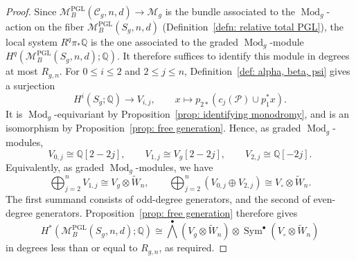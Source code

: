 \documentclass[10pt,a4paper]{amsart}
\DeclareMathOperator{\Mod}{Mod}
\DeclareMathOperator{\PGL}{PGL}
\DeclareMathOperator{\Sym}{Sym}
\newcommand{\C}{\mathcal{C}}
\newcommand{\M}{\mathcal{M}}
\newcommand{\QQ}{\mathbb{Q}}
\newcommand{\mc}{\mathcal}
\newcommand{\tW}{\widetilde{W}}
\begin{document}
\begin{proof}
Since $\M_B^{\PGL}(\C_g,n,d)\to\M_g$ is the bundle associated to the $\Mod_g$-action on the fiber $\M_B^{\PGL}(S_g,n,d)$ (Definition~\ref{defn: relative total PGL}), the local system $R^q\pi_*\QQ$ is the one associated to the graded $\Mod_g$-module $H^q(\M_B^{\PGL}(S_g,n,d);\QQ)$. It therefore suffices to identify this module in degrees at most $R_{g,n}$.
For $0\le i\le 2$ and $2\le j\le n$, Definition~\ref{def: alpha, beta, psi} gives a surjection
\[
H^i(S_g;\QQ)\longrightarrow V_{i,j},
\qquad
x\longmapsto p_{2*}(c_j(\mc P)\cup p_1^*x).
\]
It is $\Mod_g$-equivariant by Proposition~\ref{prop: identifying monodromy}, and is an isomorphism by Proposition~\ref{prop: free generation}. Hence, as graded $\Mod_g$-modules,
\[
V_{0,j}\cong \QQ[2-2j],\qquad
V_{1,j}\cong V_g[2-2j],\qquad
V_{2,j}\cong \QQ[-2j].
\]
Equivalently, as graded $\Mod_g$-modules, we have
\[
\bigoplus_{j=2}^n V_{1,j}\cong V_g\otimes \tW_n,
\qquad
\bigoplus_{j=2}^n(V_{0,j}\oplus V_{2,j})\cong V_\circ\otimes \tW_n.
\]
The first summand consists of odd-degree generators, and the second of even-degree generators. Proposition~\ref{prop: free generation} therefore gives
\[
H^*(\M_B^{\PGL}(S_g,n,d);\QQ)\cong
\textstyle{\bigwedge^\bullet}(V_g\otimes \tW_n)
\otimes
\Sym^\bullet(V_\circ\otimes \tW_n)
\]
in degrees less than or equal to $R_{g,n}$, as required. 
\end{proof}
\end{document}

